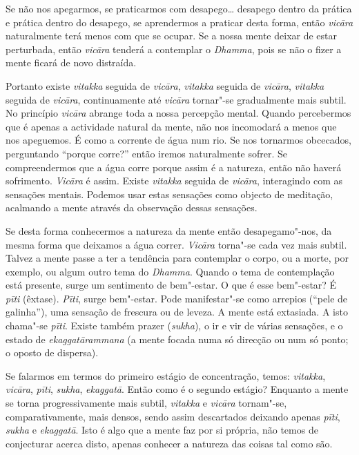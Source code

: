 Se não nos apegarmos, se praticarmos com desapego\ldots{} desapego
dentro da prática e prática dentro do desapego, se aprendermos a
praticar desta forma, então \emph{vicāra} naturalmente terá menos com
que se ocupar. Se a nossa mente deixar de estar perturbada, então
\emph{vicāra} tenderá a contemplar o \emph{Dhamma}, pois se não o fizer
a mente ficará de novo distraída.

Portanto existe \emph{vitakka} seguida de \emph{vicāra}, \emph{vitakka}
seguida de \emph{vicāra}, \emph{vitakka} seguida de \emph{vicāra},
continuamente até \emph{vicāra} tornar"-se gradualmente mais subtil. No
princípio \emph{vicāra} abrange toda a nossa percepção mental. Quando
percebermos que é apenas a actividade natural da mente, não nos
incomodará a menos que nos apeguemos. É como a corrente de água num rio.
Se nos tornarmos obcecados, perguntando ``porque corre?'' então iremos
naturalmente sofrer. Se compreendermos que a água corre porque assim é a
natureza, então não haverá sofrimento. \emph{Vicāra} é assim. Existe
\emph{vitakka} seguida de \emph{vicāra}, interagindo com as sensações
mentais. Podemos usar estas sensações como objecto de meditação,
acalmando a mente através da observação dessas sensações.

Se desta forma conhecermos a natureza da mente então desapegamo"-nos, da
mesma forma que deixamos a água correr. \emph{Vicāra} torna"-se cada vez
mais subtil. Talvez a mente passe a ter a tendência para contemplar o
corpo, ou a morte, por exemplo, ou algum outro tema do \emph{Dhamma}.
Quando o tema de contemplação está presente, surge um sentimento de
bem"-estar. O que é esse bem"-estar? É \emph{pīti} (êxtase). \emph{Pīti},
surge bem"-estar. Pode manifestar"-se como arrepios (``pele de galinha''),
uma sensação de frescura ou de leveza. A mente está extasiada. A isto
chama"-se \emph{pīti}. Existe também prazer (\emph{sukha}), o ir e vir de
várias sensações, e o estado de \emph{ekaggatārammana} (a mente focada
numa só direcção ou num só ponto; o oposto de dispersa).

Se falarmos em termos do primeiro estágio de concentração, temos:
\emph{vitakka}, \emph{vicāra}, \emph{pīti}, \emph{sukha},
\emph{ekaggatā}. Então como é o segundo estágio? Enquanto a mente se
torna progressivamente mais subtil, \emph{vitakka} e \emph{vicāra}
tornam"-se, comparativamente, mais densos, sendo assim descartados
deixando apenas \emph{pīti}, \emph{sukha} e \emph{ekaggatā}. Isto é algo
que a mente faz por si própria, não temos de conjecturar acerca disto,
apenas conhecer a natureza das coisas tal como são.

